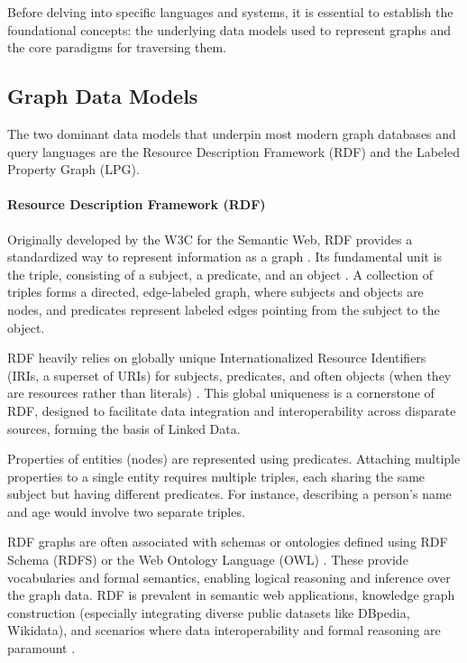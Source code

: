 \documentclass[sigconf,natbib=false]{acmart}
\begin{document}
Before delving into specific languages and systems, it is essential to establish the foundational concepts: the underlying data models used to represent graphs and the core paradigms for traversing them.

\subsection{Graph Data Models}

The two dominant data models that underpin most modern graph databases and query languages are the Resource Description Framework (RDF) and the Labeled Property Graph (LPG).

\paragraph{Resource Description Framework (RDF)}
Originally developed by the W3C for the Semantic Web, RDF provides a standardized way to represent information as a graph \cite{RDFSemanticWeb}.
Its fundamental unit is the triple, consisting of a subject, a predicate, and an object \cite{RDF11Concepts}.
A collection of triples forms a directed, edge-labeled graph, where subjects and objects are nodes, and predicates represent labeled edges pointing from the subject to the object.

RDF heavily relies on globally unique Internationalized Resource Identifiers (IRIs, a superset of URIs) for subjects, predicates, and often objects (when they are resources rather than literals) \cite{RDF11Concepts}.
This global uniqueness is a cornerstone of RDF, designed to facilitate data integration and interoperability across disparate sources, forming the basis of Linked Data. %

Properties of entities (nodes) are represented using predicates.
Attaching multiple properties to a single entity requires multiple triples, each sharing the same subject but having different predicates.
For instance, describing a person's name and age would involve two separate triples.

RDF graphs are often associated with schemas or ontologies defined using RDF Schema (RDFS) \cite{RDFSchema11} or the Web Ontology Language (OWL) \cite{OWL2Web}.
These provide vocabularies and formal semantics, enabling logical reasoning and inference over the graph data.
RDF is prevalent in semantic web applications, knowledge graph construction (especially integrating diverse public datasets like DBpedia, Wikidata), and scenarios where data interoperability and formal reasoning are paramount \cite{ali2021SurveyRDFStores}.
\end{document}
